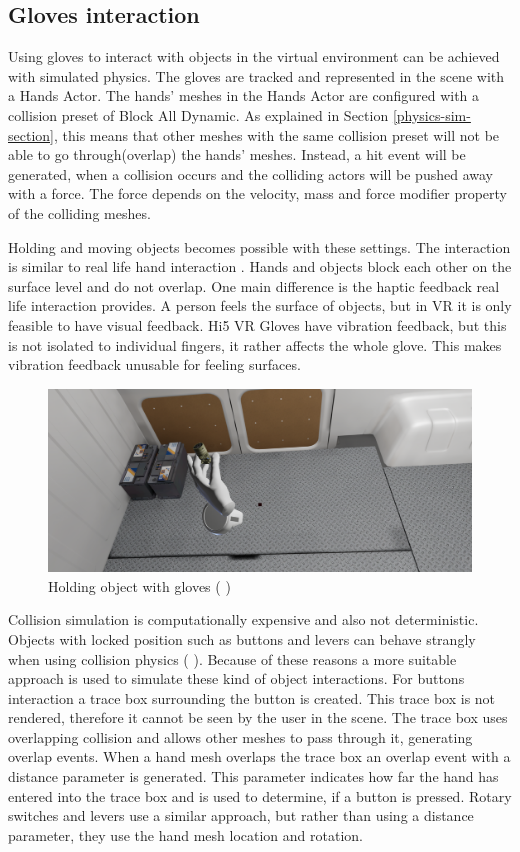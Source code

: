 \documentclass[12pt, a4paper,oneside, nocenter]{thesis}
\newcommand{\citeyearxamk}[1]{(\citeauthor{#1} \citeyear{#1})}
\renewcommand{\citeyearpar}[1]{(\citeauthor{#1} \citeyear{#1})}
\begin{document}
\subsection{Gloves interaction}
Using gloves to interact with objects in the virtual environment can be achieved with simulated physics. The gloves are tracked and represented in the scene with a Hands Actor. The hands' meshes in the Hands Actor are configured with a collision preset of Block All Dynamic. As explained in Section \ref{physics-sim-section}, this means that other meshes with the same collision preset will not be able to go through(overlap) the hands' meshes. Instead, a hit event will be generated, when a collision occurs and the colliding actors will be pushed away with a force. The force depends on the velocity, mass and force modifier property of the colliding meshes.
\par
Holding and moving objects becomes possible with these settings. The interaction is similar to real life hand interaction . Hands and objects block each other on the surface level and do not overlap. One main difference is the haptic feedback real life interaction provides. A person feels the surface of objects, but in VR it is only feasible to have visual feedback. Hi5 VR Gloves have vibration feedback, but this is not isolated to individual fingers, it rather affects the whole glove. This makes vibration feedback unusable for feeling surfaces.
\begin{figure}[H]
	\includegraphics[width=\textwidth]{gloves-grab}
	\caption{Holding object with gloves \citeyearpar{obsas-assets}}
	\label{fig:gloves-grab}
\end{figure}
\par
 Collision simulation is computationally expensive and also not deterministic. Objects with locked position such as buttons and levers can behave strangly when using collision physics \citeyearxamk{collaborative-vr}. Because of these reasons a more suitable approach is used to simulate these kind of object interactions. For buttons interaction a trace box surrounding the button is created. This trace box is not rendered, therefore it cannot be seen by the user in the scene. The trace box uses overlapping collision and allows other meshes to pass through it, generating overlap events. When a hand mesh overlaps the trace box an overlap event with a distance parameter is generated. This parameter indicates how far the hand has entered into the trace box and is used to determine, if a button is pressed. Rotary switches and levers use a similar approach, but rather than using a distance parameter, they use the hand mesh location and rotation.
\end{document}
